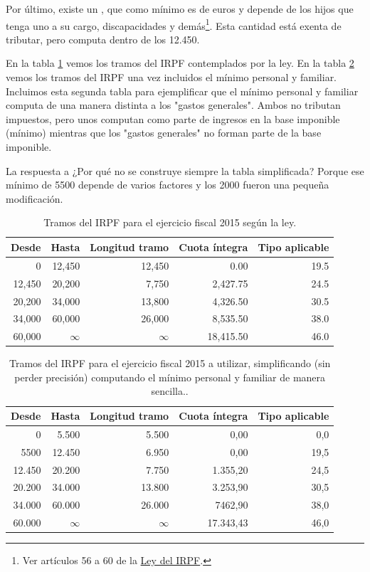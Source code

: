 \documentclass[nochap,palatino,shortheader]{apuntes}
\begin{document}
Por último, existe un , que como mínimo es de  euros y depende de los hijos que tenga uno a su cargo, discapacidades y demás\footnote{Ver artículos 56 a 60 de la \href{https://www.boe.es/buscar/act.php?id=BOE-A-2006-20764&b=29&tn=1&p=20141128}{Ley del IRPF}.}. 
Esta cantidad está exenta de tributar, pero computa dentro de los 12.450\texteuro. 


En la tabla \ref{tab:Tramos2015IRPF} vemos los tramos del IRPF contemplados por la ley. En la tabla \ref{tab:Tramos2015IRPF_FMM} vemos los tramos del IRPF una vez incluidos el mínimo personal y familiar. 
Incluimos esta segunda tabla para ejemplificar que el mínimo personal y familiar computa de una manera distinta a los "gastos generales". Ambos no tributan impuestos, pero unos computan como parte de ingresos en la base imponible (mínimo) mientras que los "gastos generales" no forman parte de la base imponible.

La respuesta a ¿Por qué no se construye siempre la tabla simplificada? Porque ese mínimo de 5500 depende de varios factores y los 2000 fueron una pequeña modificación.


\begin{table}[hbtp]
\centering
\footnotesize
\begin{tabular}{r|r|r|r|r}
\textbf{Desde} & \textbf{Hasta} & \textbf{Longitud tramo} & \textbf{Cuota íntegra} & \textbf{Tipo aplicable} \\ \toprule
0 & 12,450 & 12,450 & 0.00 & 19.5 \\
12,450 & 20,200 & 7,750 & 2,427.75 & 24.5 \\
20,200 & 34,000 & 13,800 & 4,326.50 & 30.5 \\
34,000 & 60,000 & 26,000 & 8,535.50 & 38.0 \\
60,000 & $\infty$ & $\infty$ & 18,415.50 & 46.0 \\
\end{tabular}
\caption{Tramos del IRPF para el ejercicio fiscal 2015 según la ley.}
\label{tab:Tramos2015IRPF}
\end{table}

\begin{table}[hbtp]
\centering
\footnotesize
\begin{tabular}{r|r|r|r|r}
\textbf{Desde} & \textbf{Hasta} & \textbf{Longitud tramo} & \textbf{Cuota íntegra} & \textbf{Tipo aplicable} \\ \toprule
0 & 5.500 & 5.500 & 0,00 & 0,0 \\
5500 & 12.450 & 6.950 & 0,00 & 19,5 \\
12.450 & 20.200 & 7.750 & 1.355,20 & 24,5 \\
20.200 & 34.000 & 13.800 & 3.253,90 & 30,5 \\
34.000 & 60.000 & 26.000 & 7462,90 & 38,0 \\
60.000 & $\infty$ & $\infty$ & 17.343,43 & 46,0 \\
\end{tabular}
\caption{Tramos del IRPF para el ejercicio fiscal 2015 a utilizar,  simplificando (sin perder precisión) computando el mínimo personal y familiar de manera sencilla..}
\label{tab:Tramos2015IRPF_FMM}
\end{table}
\end{document}
